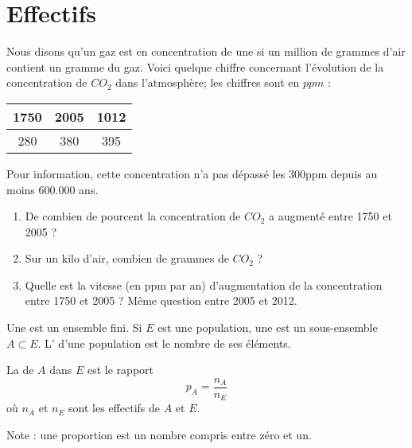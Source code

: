 
\section{Effectifs}

Nous disons qu'un gaz est en concentration de une  si un million de grammes d'air contient un gramme du gaz. Voici quelque chiffre concernant l'évolution de la concentration de \( CO_2\) dans l'atmosphère; les chiffres sont en \( \unit{}{ppm}\) :
\begin{center}
\begin{tabular}{|c|c|c|}
    \hline
    1750    &   2005    &   1012\\
    \hline
    280&380&395\\
    \hline
\end{tabular}
\end{center}
Pour information, cette concentration n'a pas dépassé les \unit{300}{ppm} depuis au moins \( 600.000\) ans.

\begin{enumerate}
    \item
        De combien de pourcent la concentration de \( CO_2\) a augmenté entre 1750 et 2005 ?
    \item
        Sur un kilo d'air, combien de grammes de \( CO_2\) ?
    \item 
        Quelle est la vitesse (en ppm par an) d'augmentation de la concentration entre 1750 et 2005 ? Même question entre 2005 et 2012.
\end{enumerate}

\begin{definition}
    Une  est un ensemble fini. Si \( E\) est une population, une  est un sous-ensemble \( A\subset E\). L' d'une population est le nombre de ses éléments.

    La  de \( A\) dans \( E\) est le rapport
    \begin{equation}
        p_A=\frac{ n_A }{ n_E }
    \end{equation}
    où \( n_A\) et \( n_E\) sont les effectifs de \( A\) et \( E\).
\end{definition}
Note : une proportion est un nombre compris entre zéro et un.

